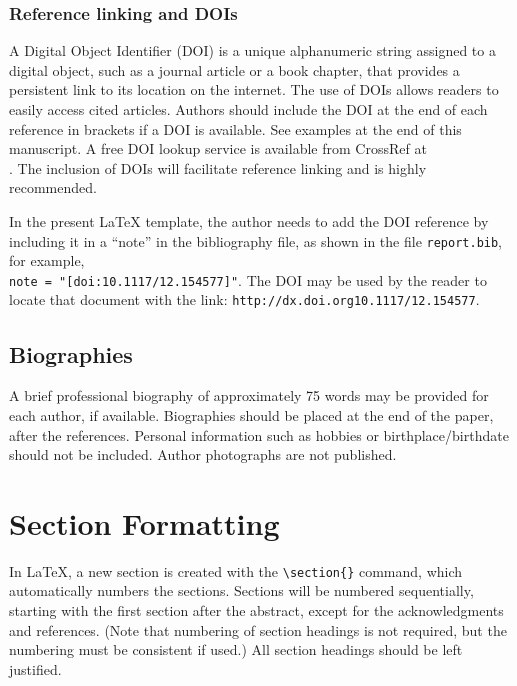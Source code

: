 \documentclass[12pt]{spieman}  %
\begin{document}
\begin{spacing}{2}
\subsubsection{Reference linking and DOIs}
A Digital Object Identifier (DOI) is a unique alphanumeric string assigned to a digital object, such as a journal article or a book chapter, that provides a persistent link to its location on the internet. The use of DOIs allows readers to easily access cited articles. Authors should include the DOI at the end of each reference in brackets if a DOI is available. See examples at the end of this manuscript. A free DOI lookup service is available from CrossRef at \\. The inclusion of DOIs will facilitate reference linking and is highly recommended.

In the present LaTeX template, the author needs to add the DOI reference by including it in a ``note'' in the bibliography file, as shown in the file {\verb+report.bib+}, for example, \\ {\verb+note = "[doi:10.1117/12.154577]"+}. The DOI may be used by the reader to locate that document with the link: {\verb+http://dx.doi.org10.1117/12.154577+}.

\subsection{Biographies}
A brief professional biography of approximately 75 words may be provided for each author, if available. Biographies should be placed at the end of the paper, after the references. Personal information such as hobbies or birthplace/birthdate should not be included. Author photographs are not published.

\section{Section Formatting}
\label{sect:sections}
In LaTeX, a new section is created with the \verb|\section{}| command, which automatically numbers the sections. Sections will be numbered sequentially, starting with the first section after the abstract, except for the acknowledgments and references. (Note that numbering of section headings is not required, but the numbering must be consistent if used.) All section headings should be left justified.


\end{spacing}
\end{document}
